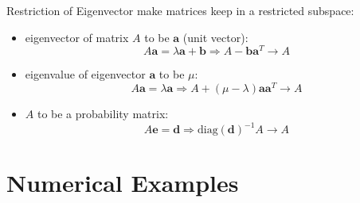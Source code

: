 \documentclass[fleqn,aspectratio=1610]{beamer}
\begin{document}
\begin{frame}[label={sec:orgc948180}]{Restriction of Eigenvector}
make matrices keep in a restricted subspace:
\begin{itemize}
\item eigenvector of matrix \(A\) to be
\(\boldsymbol{a}\) (unit vector):
\begin{equation}
  A\boldsymbol{a}=\lambda \boldsymbol{a}+\boldsymbol{b}
  \Rightarrow A-\boldsymbol{b}\boldsymbol{a}^T \rightarrow A
\end{equation}
\item eigenvalue of eigenvector \(\boldsymbol{a}\)
to be \(\mu\):
\begin{equation}
  A\boldsymbol{a}=\lambda \boldsymbol{a}
  \Rightarrow A+(\mu-\lambda)\boldsymbol{a}\boldsymbol{a}^T \rightarrow A
\end{equation}
\item \(A\) to be a probability matrix:
\begin{equation}
  A\boldsymbol{e}=\boldsymbol{d}
  \Rightarrow \mathrm{diag}(\boldsymbol{d})^{-1}A \rightarrow A
\end{equation}
\end{itemize}
\end{frame}
\section{Numerical Examples}
\label{sec:org871e20c}
\end{document}
